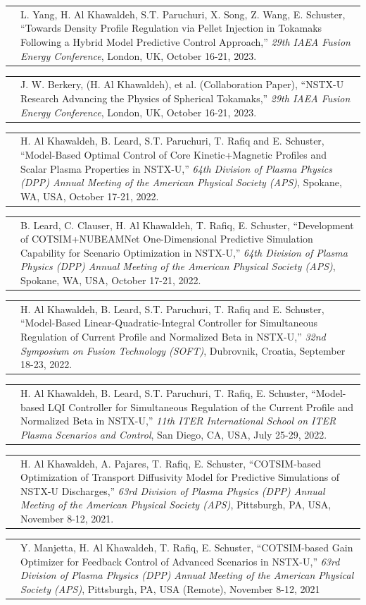 \documentclass[11pt,letterpaper]{article}
\makeatletter
\newcommand{\CVItem}[2]{%
  \begin{tabularx}{\textwidth}{@{}p{0.83in}@{\hspace{0.15in}}X@{}}
    \raggedleft{#1} & #2\\[3pt]
  \end{tabularx}
}
\makeatother
\begin{document}
\CVItem{[15]}{L. Yang, H. Al Khawaldeh, S.T. Paruchuri, X. Song, Z. Wang, E. Schuster, ``Towards Density Profile Regulation via Pellet Injection in Tokamaks Following a Hybrid Model Predictive Control Approach,'' \textit{29th IAEA Fusion Energy Conference}, London, UK, October 16-21, 2023.}

\CVItem{[16]}{J. W. Berkery, (H. Al Khawaldeh), et al. (Collaboration Paper), ``NSTX-U Research Advancing the Physics of Spherical Tokamaks,'' \textit{29th IAEA Fusion Energy Conference}, London, UK, October 16-21, 2023.}

\CVItem{[17]}{H. Al Khawaldeh, B. Leard, S.T. Paruchuri, T. Rafiq and E. Schuster, ``Model-Based Optimal Control of Core Kinetic+Magnetic Profiles and Scalar Plasma Properties in NSTX-U,'' \textit{64th Division of Plasma Physics (DPP) Annual Meeting of the American Physical Society (APS)}, Spokane, WA, USA, October 17-21, 2022.}

\CVItem{[18]}{B. Leard, C. Clauser, H. Al Khawaldeh, T. Rafiq, E. Schuster, ``Development of COTSIM+NUBEAMNet One-Dimensional Predictive Simulation Capability for Scenario Optimization in NSTX-U,'' \textit{64th Division of Plasma Physics (DPP) Annual Meeting of the American Physical Society (APS)}, Spokane, WA, USA, October 17-21, 2022.}

\CVItem{[19]}{H. Al Khawaldeh, B. Leard, S.T. Paruchuri, T. Rafiq and E. Schuster, ``Model-Based Linear-Quadratic-Integral Controller for Simultaneous Regulation of Current Profile and Normalized Beta in NSTX-U,'' \textit{32nd Symposium on Fusion Technology (SOFT)}, Dubrovnik, Croatia, September 18-23, 2022.}

\CVItem{[20]}{H. Al Khawaldeh, B. Leard, S.T.  Paruchuri, T. Rafiq, E. Schuster, ``Model-based LQI Controller for Simultaneous Regulation of the Current Profile and Normalized Beta in NSTX-U,'' \textit{11th ITER International School on ITER Plasma Scenarios and Control}, San Diego, CA, USA, July 25-29, 2022.}

\CVItem{[21]}{H. Al Khawaldeh, A. Pajares, T. Rafiq, E. Schuster, ``COTSIM-based Optimization of Transport Diffusivity Model for Predictive Simulations of NSTX-U Discharges,'' \textit{63rd Division of Plasma Physics (DPP) Annual Meeting of the American Physical Society (APS)}, Pittsburgh, PA, USA, November 8-12, 2021. }

\CVItem{[22]}{Y. Manjetta, H. Al Khawaldeh, T. Rafiq, E. Schuster, ``COTSIM-based Gain Optimizer for Feedback Control of Advanced Scenarios in NSTX-U,'' \textit{63rd Division of Plasma Physics (DPP) Annual Meeting of the American Physical Society (APS)}, Pittsburgh, PA, USA (Remote), November 8-12, 2021 }
\end{document}

